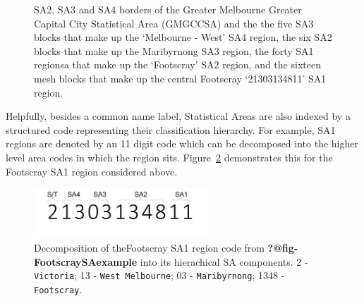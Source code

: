 \documentclass[
  letterpaper,
  DIV=11,
  numbers=noendperiod]{scrartcl}
\begin{document}
\begin{figure}

\begin{minipage}[t]{0.50\linewidth}

{\centering 


}

\subcaption{\label{fig-GMelbSA2SA3SA4-1}}
\end{minipage}%
%
\begin{minipage}[t]{0.50\linewidth}

{\centering 


}

\subcaption{\label{fig-GMelbSA2SA3SA4-2}}
\end{minipage}%

\caption{\label{fig-GMelbSA2SA3SA4}SA2, SA3 and SA4 borders of the
Greater Melbourne Greater Capital City Statistical Area (GMGCCSA) and
the the five SA3 blocks that make up the `Melbourne - West' SA4 region,
the six SA2 blocks that make up the Maribyrnong SA3 region, the forty
SA1 regionsa that make up the `Footscray' SA2 region, and the sixteen
mesh blocks that make up the central Footscray `21303134811' SA1
region.}

\end{figure}

Helpfully, besides a common name label, Statistical Areas are also
indexed by a structured code representing their classification
hierarchy. For example, SA1 regions are denoted by an 11 digit code
which can be decomposed into the higher level area codes in which the
region sits. Figure~\ref{fig-FootscraySA1Code} demonstrates this for the
Footscray SA1 region considered above.

\begin{figure}

{\centering \includegraphics[width=2.58333in,height=\textheight]{figures/FootscraySA1eg.png}

}

\caption{\label{fig-FootscraySA1Code}Decomposition of theFootscray SA1
region code from \textbf{?@fig-FootscraySAexample} into its hierachical
SA components. 2 - \texttt{Victoria}; 13 - \texttt{West\ Melbourne}; 03
- \texttt{Maribyrnong}; 1348 - \texttt{Footscray}.}

\end{figure}
\end{document}
